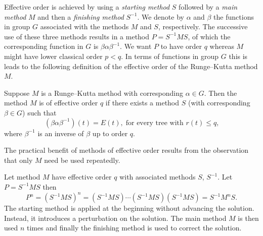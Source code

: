 Effective order is achieved by using a \emph{starting method} $S$
followed by a \emph{main method} $M$
and then a \emph{finishing method} $S^{-1}$.
We denote by $\alpha$ and $\beta$ the functions in group $G$ associated with the methods $M$ and $S$, respectively.
The successive use of these three methods results in a method $P = S^{-1}MS$, of which the corresponding function in $G$ is $\beta\alpha\beta^{-1}$.
We want $P$ to have order $q$ whereas $M$ might have lower classical
order $p < q$.
In terms of functions in group $G$ this is leads to the following definition of the effective order of the Runge--Kutta method $M$.
\begin{definition}\cite{Butcher1987_book}\label{def:Effective_order}
  Suppose $M$ is a Runge--Kutta method with corresponding $\alpha \in G$.
  Then the method $M$ is of effective order $q$ if there exists a method
  $S$ (with corresponding $\beta \in G$) such that
	\begin{equation}\label{eq:Effective_order_1}
		(\beta\alpha\beta^{-1})(t) = E(t), \; \text{for every tree with $r(t) \leq q$,}
	\end{equation}
        where $\beta^{-1}$ is an inverse of $\beta$ up to order $q$.
\end{definition}
The practical benefit of methods of effective order results from the
observation that only $M$ need be used repeatedly.
\begin{result}
  Let method $M$ have effective order $q$ with associated methods $S$,
  $S^{-1}$.  Let $P=S^{-1}MS$ then
  $$P^n = (S^{-1}MS)^n = (S^{-1}MS) \cdots (S^{-1}MS) (S^{-1}MS)
        = S^{-1} M^n S.$$
The starting method is applied at the beginning without advancing the
solution.
Instead, it introduces a perturbation on the solution.
The main method \( M \) is then used \( n \) times and finally the
finishing method is used to correct the solution.
\end{result}



